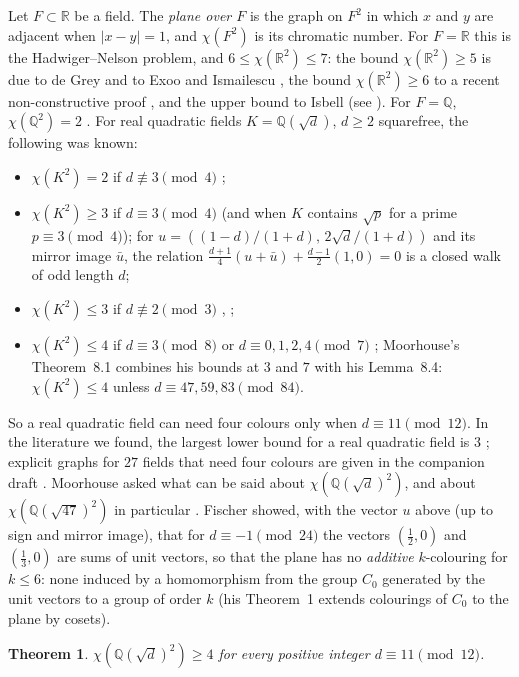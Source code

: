 \documentclass[11pt,a4paper]{amsart}
\newtheorem{theorem}{Theorem}
\theoremstyle{remark}
\newcommand{\Q}{\mathbb{Q}}
\newcommand{\R}{\mathbb{R}}
\begin{document}
Let $F\subset\R$ be a field. The \emph{plane over $F$} is the graph on $F^2$ in which $x$ and $y$ are adjacent when
$|x-y|=1$, and $\chi(F^2)$ is its chromatic number. For $F=\R$ this is the Hadwiger--Nelson problem, and
$6\le\chi(\R^2)\le7$: the bound $\chi(\R^2)\ge5$ is due to de Grey \cite{deGrey} and to Exoo and Ismailescu
\cite{EI}, the bound $\chi(\R^2)\ge6$ to a recent non-constructive proof \cite{OpenAI}, and the upper bound to
Isbell (see \cite{Soifer}). For $F=\Q$, $\chi(\Q^2)=2$ \cite{Woodall}. For real quadratic fields
$K=\Q(\sqrt d)$, $d\ge2$ squarefree, the following was known:
\begin{itemize}
\item $\chi(K^2)=2$ if $d\not\equiv3\pmod4$ \cite{Johnson1987,Fischer1990,Moorhouse};
\item $\chi(K^2)\ge3$ if $d\equiv3\pmod4$ \cite[Thm.~8]{Fischer1990} (and \cite[Thm.~8.6]{Moorhouse} when $K$
contains $\sqrt p$ for a prime $p\equiv3\pmod4$); for
$u=((1-d)/(1+d),\,2\sqrt d/(1+d))$ and its mirror image $\bar u$, the relation
$\frac{d+1}4(u+\bar u)+\frac{d-1}2(1,0)=0$ is a closed walk of odd length $d$;
\item $\chi(K^2)\le3$ if $d\not\equiv2\pmod3$ \cite[Thm.~9]{Fischer1990}, \cite[Cor.~8.3]{Moorhouse};
\item $\chi(K^2)\le4$ if $d\equiv3\pmod8$ \cite[Thm.~10]{Fischer1990} or $d\equiv0,1,2,4\pmod7$
\cite[Cor.~8.3]{Moorhouse}; Moorhouse's Theorem~8.1 combines his bounds at $3$ and $7$ with his Lemma~8.4:
$\chi(K^2)\le4$ unless $d\equiv47,59,83\pmod{84}$.
\end{itemize}
So a real quadratic field can need four colours only when $d\equiv11\pmod{12}$. In the literature we found, the
largest lower bound for a real quadratic field is $3$ \cite{Madore,Moorhouse,Fischer1990}; explicit graphs for $27$
fields that need four colours are given in the companion draft \cite{QP}. Moorhouse
asked what can be said about $\chi(\Q(\sqrt d)^2)$, and about $\chi(\Q(\sqrt{47})^2)$ in particular
\cite{MoorhouseTalk}. Fischer \cite[Thm.~10(ii)]{Fischer1990} showed, with the vector $u$ above (up to sign and
mirror image), that for $d\equiv-1\pmod{24}$ the vectors $(\frac12,0)$ and $(\frac13,0)$ are sums of unit vectors,
so that the plane has no \emph{additive} $k$-colouring for $k\le6$: none induced by a homomorphism from the group
$C_0$ generated by the unit vectors to a group of order $k$ (his Theorem~1 extends colourings of $C_0$ to the plane by
cosets).

\begin{theorem}\label{thm:main}
$\chi(\Q(\sqrt d)^2)\ge4$ for every positive integer $d\equiv11\pmod{12}$.
\end{theorem}
\end{document}

